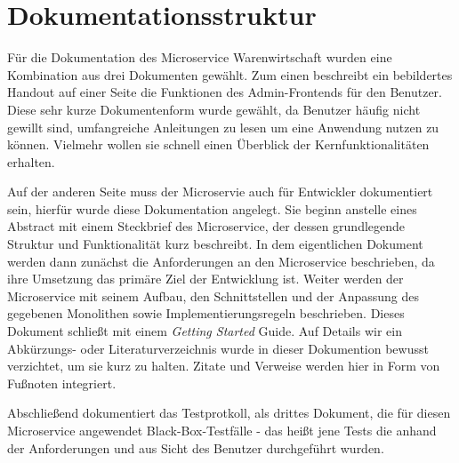 \section{Dokumentationsstruktur}
\label{sec: Dokumentationsstruktur}

Für die Dokumentation des Microservice Warenwirtschaft wurden eine Kombination aus drei Dokumenten gewählt. Zum einen beschreibt ein bebildertes Handout auf einer Seite die Funktionen des Admin-Frontends für den Benutzer. Diese sehr kurze Dokumentenform wurde gewählt, da Benutzer häufig nicht gewillt sind, umfangreiche Anleitungen zu lesen um eine Anwendung nutzen zu können. Vielmehr wollen sie schnell einen Überblick der Kernfunktionalitäten erhalten.\par 
Auf der anderen Seite muss der Microservie auch für Entwickler dokumentiert sein, hierfür wurde diese Dokumentation angelegt. Sie beginn anstelle eines Abstract mit einem Steckbrief des Microservice, der dessen grundlegende Struktur und Funktionalität kurz beschreibt. In dem eigentlichen Dokument werden dann zunächst die Anforderungen an den Microservice beschrieben, da ihre Umsetzung das primäre Ziel der Entwicklung ist. Weiter werden der Microservice mit seinem Aufbau, den Schnittstellen und der Anpassung des gegebenen Monolithen sowie Implementierungsregeln beschrieben. Dieses Dokument schließt mit einem \textit{Getting Started} Guide. Auf Details wir ein Abkürzungs- oder Literaturverzeichnis wurde in dieser Dokumention bewusst verzichtet, um sie kurz zu halten. Zitate und Verweise werden hier in Form von Fußnoten integriert.\par 
Abschließend dokumentiert das Testprotkoll, als drittes Dokument, die für diesen Microservice angewendet Black-Box-Testfälle - das heißt jene Tests die anhand der Anforderungen und aus Sicht des Benutzer durchgeführt wurden.